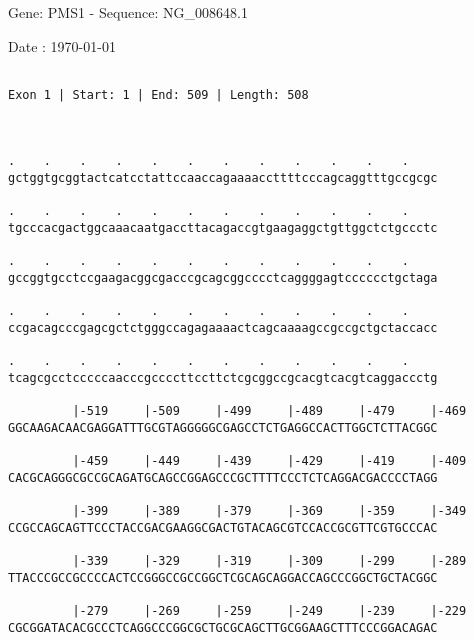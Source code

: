 \documentclass{article}
\begin{document}
\begin{center}
\begin{large}
 Gene: PMS1 - Sequence: NG\_008648.1
 
 Date : \today
\end{large}
\end{center}
 \begin{Verbatim}
 
Exon 1 | Start: 1 | End: 509 | Length: 508



.    .    .    .    .    .    .    .    .    .    .    .    
gctggtgcggtactcatcctattccaaccagaaaaccttttcccagcaggtttgccgcgc
                                                            
.    .    .    .    .    .    .    .    .    .    .    .    
tgcccacgactggcaaacaatgaccttacagaccgtgaagaggctgttggctctgccctc
                                                            
.    .    .    .    .    .    .    .    .    .    .    .    
gccggtgcctccgaagacggcgacccgcagcggcccctcaggggagtcccccctgctaga
                                                            
.    .    .    .    .    .    .    .    .    .    .    .    
ccgacagcccgagcgctctgggccagagaaaactcagcaaaagccgccgctgctaccacc
                                                            
.    .    .    .    .    .    .    .    .    .    .    .    
tcagcgcctcccccaacccgccccttccttctcgcggccgcacgtcacgtcaggaccctg
                                                            
         |-519     |-509     |-499     |-489     |-479     |-469
GGCAAGACAACGAGGATTTGCGTAGGGGGCGAGCCTCTGAGGCCACTTGGCTCTTACGGC
                                                            
         |-459     |-449     |-439     |-429     |-419     |-409
CACGCAGGGCGCCGCAGATGCAGCCGGAGCCCGCTTTTCCCTCTCAGGACGACCCCTAGG
                                                            
         |-399     |-389     |-379     |-369     |-359     |-349
CCGCCAGCAGTTCCCTACCGACGAAGGCGACTGTACAGCGTCCACCGCGTTCGTGCCCAC
                                                            
         |-339     |-329     |-319     |-309     |-299     |-289
TTACCCGCCGCCCCACTCCGGGCCGCCGGCTCGCAGCAGGACCAGCCCGGCTGCTACGGC
                                                            
         |-279     |-269     |-259     |-249     |-239     |-229
CGCGGATACACGCCCTCAGGCCCGGCGCTGCGCAGCTTGCGGAAGCTTTCCCGGACAGAC
                                                            

\end{Verbatim}
\end{document}
